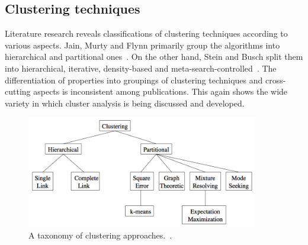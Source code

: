 \subsection{Clustering techniques}
\label{chapter:clustering-techniques}

Literature research reveals classifications of clustering techniques according to various aspects. Jain, Murty and Flynn primarily group the algorithms into hierarchical and partitional ones~\cite{Jain99clusterreview}. On the other hand, Stein and Busch split them into hierarchical, iterative, density-based and meta-search-controlled~\cite{Stein05density}. The differentiation of properties into groupings of clustering techniques and cross-cutting aspects is inconsistent among publications. This again shows the wide variety in which cluster analysis is being discussed and developed.

\begin{figure}[h]
  \begin{center}
    \includegraphics[width=0.9\textwidth]{figures/clustering_approaches_jain.png}
    \caption{A taxonomy of clustering approaches.~\cite[p 275]{Jain99clusterreview}.}
    \label{fig:clusters}
  \end{center}
\end{figure}

